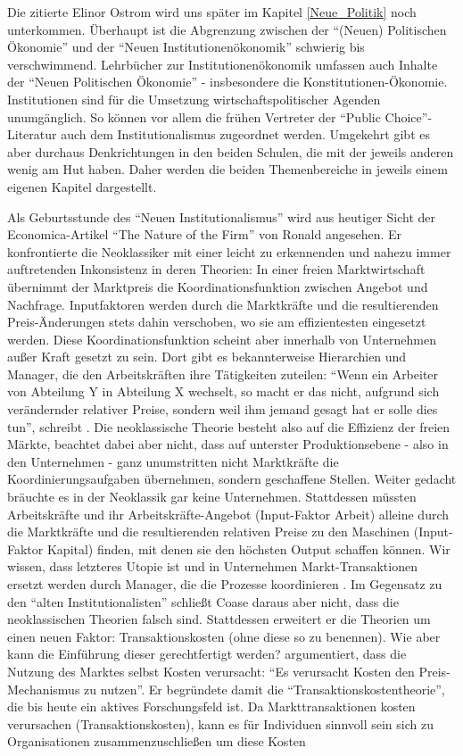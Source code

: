 Die zitierte Elinor Ostrom wird uns später im Kapitel \ref{Neue_Politik} noch unterkommen. Überhaupt ist die Abgrenzung zwischen der "`(Neuen) Politischen Ökonomie"' und der "`Neuen Institutionenökonomik"' schwierig bis verschwimmend. Lehrbücher zur Institutionenökonomik \parencite{Erlei2016, Voigt2009} umfassen auch Inhalte der "`Neuen Politischen Ökonomie"' - insbesondere die Konstitutionen-Ökonomie. Institutionen sind für die Umsetzung wirtschaftspolitischer Agenden unumgänglich. So können vor allem die frühen Vertreter der "`Public Choice"'-Literatur auch dem Institutionalismus zugeordnet werden. Umgekehrt gibt es aber durchaus Denkrichtungen in den beiden Schulen, die mit der jeweils anderen wenig am Hut haben. Daher werden die beiden Themenbereiche in jeweils einem eigenen Kapitel dargestellt.

Als Geburtsstunde des "`Neuen Institutionalismus"' wird aus heutiger Sicht der Economica-Artikel "`The Nature of the Firm"' von Ronald \textcite{Coase1937} angesehen. Er konfrontierte die Neoklassiker mit einer leicht zu erkennenden und nahezu immer auftretenden Inkonsistenz in deren Theorien: In einer freien Marktwirtschaft übernimmt der Marktpreis die Koordinationsfunktion zwischen Angebot und Nachfrage. Inputfaktoren werden durch die Marktkräfte und die resultierenden Preis-Änderungen stets dahin verschoben, wo sie am effizientesten eingesetzt werden. Diese Koordinationsfunktion scheint aber innerhalb von Unternehmen außer Kraft gesetzt zu sein. Dort gibt es bekannterweise Hierarchien und Manager, die den Arbeitskräften ihre Tätigkeiten zuteilen: "`Wenn ein Arbeiter von Abteilung Y in Abteilung X wechselt, so macht er das nicht, aufgrund sich verändernder relativer Preise, sondern weil ihm jemand gesagt hat er solle dies tun"', schreibt \textcite[S. 387]{Coase1937}. Die neoklassische Theorie besteht also auf die Effizienz der freien Märkte, beachtet dabei aber nicht, dass auf unterster Produktionsebene - also in den Unternehmen - ganz unumstritten nicht Marktkräfte die Koordinierungsaufgaben übernehmen, sondern geschaffene Stellen. Weiter gedacht bräuchte es in der Neoklassik gar keine Unternehmen. Stattdessen müssten Arbeitskräfte und ihr Arbeitskräfte-Angebot (Input-Faktor Arbeit) alleine durch die Marktkräfte und die resultierenden relativen Preise zu den Maschinen (Input-Faktor Kapital) finden, mit denen sie den höchsten Output schaffen können. Wir wissen, dass letzteres Utopie ist und in Unternehmen Markt-Transaktionen ersetzt werden durch Manager, die die Prozesse koordinieren \parencite[S. 388]{Coase1937}. Im Gegensatz zu den "`alten Institutionalisten"' schließt Coase daraus aber nicht, dass die neoklassischen Theorien falsch sind. Stattdessen erweitert er die Theorien um einen neuen Faktor: Transaktionskosten (ohne diese so zu benennen). Wie aber kann die Einführung dieser gerechtfertigt werden? \textcite[S. 390]{Coase1937} argumentiert, dass die Nutzung des Marktes selbst Kosten verursacht: "`Es verursacht Kosten den Preis-Mechanismus zu nutzen"'. Er begründete damit die  "`Transaktionskostentheorie"', die bis heute ein aktives Forschungsfeld ist. Da Markttransaktionen kosten verursachen (Transaktionskosten), kann es für Individuen sinnvoll sein sich zu Organisationen zusammenzuschließen um diese Kosten 